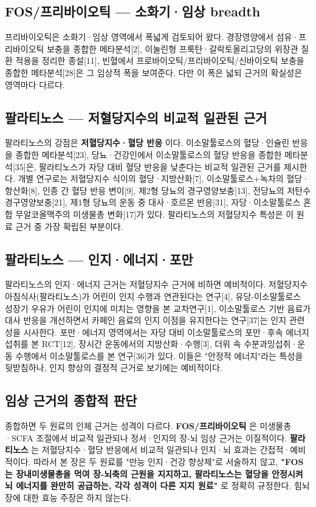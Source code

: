 \documentclass[11pt,oneside]{book}
\begin{document}
\subsection{FOS/프리바이오틱 — 소화기·임상 breadth}
프리바이오틱은 소화기·임상 영역에서 폭넓게 검토되어 왔다. 경장영양에서 섬유·프리바이오틱 보충을 종합한 메타분석[2], 이눌린형 프룩탄·갈락토올리고당의 위장관 질환 적용을 정리한 종설[11], 빈혈에서 프로바이오틱/프리바이오틱/신바이오틱 보충을 종합한 메타분석[28]은 그 임상적 폭을 보여준다. 다만 이 폭은 넓되 근거의 확실성은 영역마다 다르다.

\subsection{팔라티노스 — 저혈당지수의 비교적 일관된 근거}
팔라티노스의 강점은 \textbf{저혈당지수·혈당 반응} 이다. 이소말툴로스의 혈당·인슐린 반응을 종합한 메타분석[23], 당뇨·건강인에서 이소말툴로스의 혈당 반응을 종합한 메타분석[35]은, 팔라티노스가 자당 대비 혈당 반응을 낮춘다는 비교적 일관된 근거를 제시한다. 개별 연구로는 저혈당지수 식이의 혈당·지방산화[7], 이소말툴로스+녹차의 혈당·항산화[8], 인종 간 혈당 반응 변이[9], 제2형 당뇨의 경구영양보충[13], 전당뇨의 저탄수 경구영양보충[21], 제1형 당뇨의 운동 중 대사·호르몬 반응[31], 자당·이소말툴로스 혼합 무알코올맥주의 미생물총 변화[17]가 있다. 팔라티노스의 저혈당지수 특성은 이 원료 근거 중 가장 확립된 부분이다.

\subsection{팔라티노스 — 인지·에너지·포만}
팔라티노스의 인지·에너지 근거는 저혈당지수 근거에 비하면 예비적이다. 저혈당지수 아침식사(팔라티노스)가 어린이 인지 수행과 연관된다는 연구[4], 유당-이소말툴로스 성장기 우유가 어린이 인지에 미치는 영향을 본 교차연구[1], 이소말툴로스 기반 음료가 대사 반응을 개선하면서 카페인 음료의 인지 이점을 유지한다는 연구[37]는 인지 관련성을 시사한다. 포만·에너지 영역에서는 자당 대비 이소말툴로스의 포만·후속 에너지 섭취를 본 RCT[12], 장시간 운동에서의 지방산화·수행[3], 더위 속 수분과잉섭취·운동 수행에서 이소말툴로스를 본 연구[36]가 있다. 이들은 "안정적 에너지"라는 특성을 뒷받침하나, 인지 향상의 결정적 근거로 보기에는 예비적이다.

\subsection{임상 근거의 종합적 판단}
종합하면 두 원료의 인체 근거는 성격이 다르다. \textbf{FOS/프리바이오틱} 은 미생물총·SCFA 조절에서 비교적 일관되나 정서·인지의 장-뇌 임상 근거는 이질적이다. \textbf{팔라티노스} 는 저혈당지수·혈당 반응에서 비교적 일관되나 인지·뇌 효과는 간접적·예비적이다. 따라서 본 장은 두 원료를 "만능 인지·건강 향상제"로 서술하지 않고, \textbf{"FOS는 장내미생물총을 먹여 장-뇌축의 근원을 지지하고, 팔라티노스는 혈당을 안정시켜 뇌 에너지를 완만히 공급하는, 각각 성격이 다른 지지 원료"} 로 정확히 규정한다. 힘뇌장에 대한 효능 주장은 하지 않는다.
\end{document}
